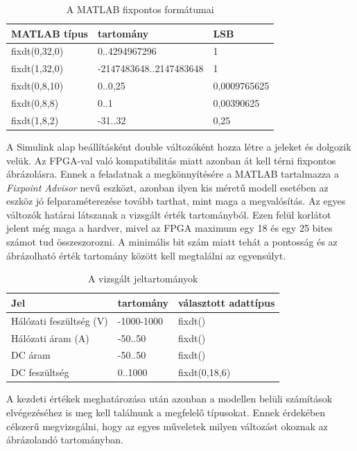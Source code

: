 \begin{table}[]
\centering
\begin{tabular}{|l|l|l|}
\hline
MATLAB típus  & tartomány               & LSB \\ \hline
fixdt(0,32,0) & 0..4294967296           & 1   \\ \hline
fixdt(1,32,0) & -2147483648..2147483648	& 1   \\ \hline
fixdt(0,8,10) & 0..0,25        	   	    & 0,0009765625 \\ \hline
fixdt(0,8,8)  & 0..1     			 	& 0,00390625    \\ \hline
fixdt(1,8,2)  & -31..32     			& 0,25    \\ \hline
\end{tabular}
\caption{A MATLAB fixpontos formátumai}
\label{tab:fixdt}
\end{table}

A Simulink alap beállításként double változóként hozza létre a jeleket és dolgozik velük. Az FPGA-val való kompatibilitás miatt azonban át kell térni fixpontos ábrázolásra. Ennek a feladatnak a megkönnyítésére a MATLAB tartalmazza a \emph{Fixpoint Advisor} nevű eszközt, azonban ilyen kis méretű modell esetében az eszköz jó felparaméterezése tovább tarthat, mint maga a megvalósítás. Az egyes változók határai látszanak a vizsgált érték tartományból. Ezen felül korlátot jelent még maga a hardver, mivel az FPGA maximum egy 18 és egy 25 bites számot tud összeszorozni. A minimális bit szám miatt tehát a pontosság és az ábrázolható érték tartomány között kell megtalálni az egyensúlyt.

\begin{table}[]
\centering
\begin{tabular}{|l|l|l|}
\hline
Jel  					&		 tartomány              & választott adattípus \\ \hline
Hálózati feszültség (V) & -1000-1000          	 		& fixdt()\\ \hline
Hálózati áram (A) 		& -50..50						& fixdt()\\ \hline
DC áram 				& -50..50        	   	   		& fixdt() \\ \hline
DC feszültség  			& 0..1000     			 		& fixdt(0,18,6)    \\ \hline
\end{tabular}
\caption{A vizsgált jeltartományok}
\label{tab:values}
\end{table} 


A kezdeti értékek meghatározása után azonban a modellen belüli számítások elvégezéséhez is meg kell találnunk a megfelelő típusokat. Ennek érdekében célszerű megvizsgálni, hogy az egyes műveletek milyen változást okoznak az ábrázolandó tartományban.

